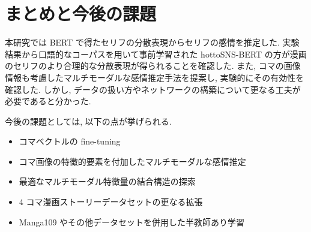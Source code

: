 \newpage
\changeindent{0cm}
\section{まとめと今後の課題}
\changeindent{2cm}

本研究では BERT で得たセリフの分散表現からセリフの感情を推定した. 実験結果から口語的なコーパスを用いて事前学習された hottoSNS-BERT の方が漫画のセリフのより合理的な分散表現が得られることを確認した. また, コマの画像情報も考慮したマルチモーダルな感情推定手法を提案し, 実験的にその有効性を確認した. しかし, データの扱い方やネットワークの構築について更なる工夫が必要であると分かった.

今後の課題としては, 以下の点が挙げられる.

\begin{itemize}
  \item コマベクトルの fine-tuning
  \item コマ画像の特徴的要素を付加したマルチモーダルな感情推定
  \item 最適なマルチモーダル特徴量の結合構造の探索
  \item 4 コマ漫画ストーリーデータセットの更なる拡張
  \item Manga109 やその他データセットを併用した半教師あり学習
\end{itemize}
